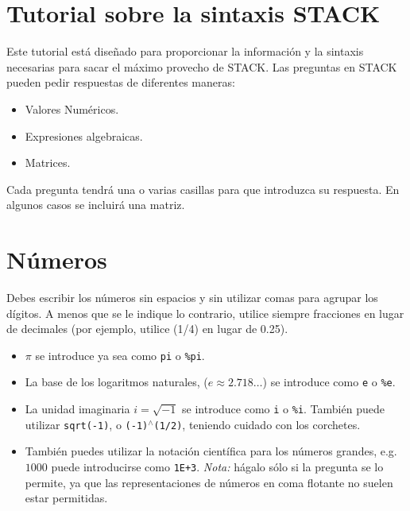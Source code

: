 \documentclass[a4paper]{article}
\newcommand{\stack}[1]{{\color{red}\tt #1}}
\begin{document}
\begin{multicols}{2}
\section*{Tutorial sobre la sintaxis STACK}
Este tutorial está diseñado para proporcionar la información y la sintaxis necesarias para sacar el máximo provecho de STACK. Las preguntas en STACK pueden pedir respuestas de diferentes maneras:
\begin{itemize}
\item Valores Numéricos.
\item Expresiones algebraicas.
\item Matrices.
\end{itemize}
Cada pregunta tendrá una o varias casillas para que introduzca su respuesta.  En algunos casos se incluirá una matriz.

\section*{Números}
Debes escribir los números sin espacios y sin utilizar comas para agrupar los dígitos.  A menos que se le indique lo contrario, utilice siempre fracciones en lugar de decimales (por ejemplo, utilice (1/4) en lugar de 0.25).
\begin{itemize}
\item $\pi$ se introduce ya sea como \stack{pi} o \stack{\%pi}.
\item La base de los logaritmos naturales, ($e \approx 2.718 \dots$) se introduce como \stack{e} o \stack{\%e}.
\item La unidad imaginaria $i=\sqrt{-1}$ se introduce como \stack{i} o \stack{\%i}. También puede utilizar \stack{sqrt(-1)}, o \stack{(-1)$^{\wedge}$(1/2)}, teniendo cuidado con los corchetes.
\item También puedes utilizar la notación científica para los números grandes, e.g. $1000$ puede introducirse como \stack{1E+3}.
     {\em Nota:} hágalo sólo si la pregunta se lo permite, ya que las representaciones de números en coma f\mbox{}lotante no suelen estar permitidas.
\end{itemize}


\end{multicols}
\end{document}
